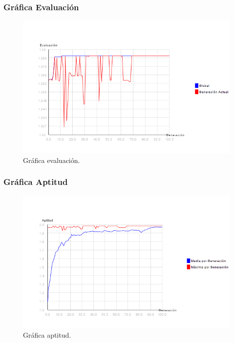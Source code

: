 \documentclass[12pt]{article}
\begin{document}
\subsubsection*{Gráfica Evaluación}
\begin{figure}[H]
\centering
\includegraphics[scale=0.5]{graficas/F1inicial_algoritmo}
\caption{Gráfica evaluación.}
\label{fig}
\end{figure}

\subsubsection*{Gráfica Aptitud}
\begin{figure}[H]
\centering
\includegraphics[scale=0.5]{graficas/F1inicial_aptitud}
\caption{Gráfica aptitud.}
\label{fig}
\end{figure}
\end{document}
